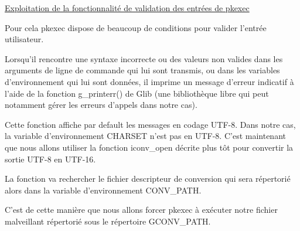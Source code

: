 \documentclass[12pt,a4paper]{article}
\begin{document}
\begin{flushleft}
            \item \underline{Exploitation de la fonctionnalité de validation des entrées de pkexec}
            \item Pour cela pkexec dispose de beaucoup de conditions pour valider l'entrée utilisateur.
            \item Lorsqu’il rencontre une syntaxe incorrecte ou des valeurs non valides dans les arguments de ligne de commande qui lui sont transmis, ou dans les variables d’environnement qui lui sont données, il imprime un message d’erreur indicatif à l’aide de la fonction g\_printerr() de Glib (une bibliothèque libre qui peut notamment gérer les erreurs d'appels dans notre cas).
            \item Cette fonction affiche par default les messages en codage UTF-8. Dans notre cas, la variable d'environnement CHARSET n'est pas en UTF-8. C'est maintenant que nous allons utiliser la fonction iconv\_open décrite plus tôt pour convertir la sortie UTF-8 en UTF-16.
            \item La fonction va rechercher le fichier descripteur de conversion qui sera répertorié alors dans la variable d'environnement CONV\_PATH.
            \item C'est de cette manière que nous allons forcer pkexec à exécuter notre fichier malveillant répertorié sous le répertoire GCONV\_PATH.



\end{flushleft}
\end{document}
